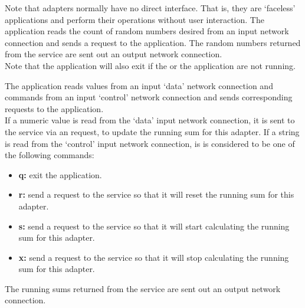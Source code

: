 Note that adapters normally have no direct interface.
That is, they are `faceless' applications and perform their operations without user
interaction.
The  application reads the count of
random numbers desired from an input \yarp{} network connection and sends a
 request to the
 application.
The random numbers returned from the service are sent out an output \yarp{} network
connection.\\

Note that the application will also exit if the
 or the
 application are not running.

The  application reads  values from an input
`data' \yarp{} network connection and commands from an input `control' \yarp{} network
connection and sends corresponding requests to the
 application.\\

If a numeric value is read from the `data' input \yarp{} network connection, it is sent to
the service via an  request, to update the
running sum for this adapter.
If a string is read from the `control' input \yarp{} network connection, is is considered
to be one of the following commands:
\begin{itemize}
\item \textbf{q:} exit the application.
\item \textbf{r:} send a  request to the
service so that it will reset the running sum for this adapter.
\item \textbf{s:} send a  request to the
service so that it will start calculating the running sum for this adapter.
\item \textbf{x:} send a  request to the
service so that it will stop calculating the running sum for this adapter.
\end{itemize}

The running sums returned from the service are sent out an output \yarp{} network
connection.\\

